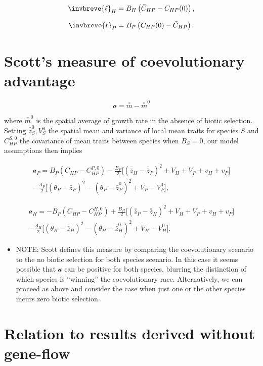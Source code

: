 \documentclass{article}
\begin{document}
\[\invbreve{\ell}_H=B_H\left(\bar C_{HP}-C_{HP}(0)\right),\]

\[\invbreve{\ell}_P=B_P\left(C_{HP}(0)-\bar C_{HP}\right).\]

\hypertarget{scotts-measure-of-coevolutionary-advantage}{%
\section{Scott's measure of coevolutionary
advantage}\label{scotts-measure-of-coevolutionary-advantage}}

\[\mathcal a=\bar{\bar m}-\bar{\bar m}^0\]

where \(\bar{\bar m}^0\) is the spatial average of growth rate in the
absence of biotic selection. Setting \(\bar{\bar z}_S^0, V_S^0\) the
spatial mean and variance of local mean traits for species \(S\) and
\(C_{HP}^{S,0}\) the covariance of mean traits between species when
\(B_S=0\), our model assumptions then implies

\begin{multline}
  \mathcal a_P=B_P(C_{HP}-C_{HP}^{P,0})-\frac{B_P}{2}\big[(\bar{\bar z}_H-\bar{\bar z}_P)^2+V_H+V_P+v_H+v_P\big] \\
  -\frac{A_P}{2}\big[(\theta_P-\bar{\bar z}_P)^2-(\theta_P-\bar{\bar z}_P^0)^2+V_P-V_P^0\big],
\end{multline}

\begin{multline}
  \mathcal a_H=-B_P(C_{HP}-C_{HP}^{H,0})+\frac{B_H}{2}\big[(\bar{\bar z}_P-\bar{\bar z}_H)^2+V_H+V_P+v_H+v_P\big] \\
  -\frac{A_H}{2}\big[(\theta_H-\bar{\bar z}_H)^2-(\theta_H-\bar{\bar z}_H^0)^2+V_H-V_H^0\big].
\end{multline}

\begin{itemize}
\tightlist
\item
  NOTE: Scott defines this measure by comparing the coevolutionary
  scenario to the no biotic selection for both species scenario. In this
  case it seems possible that \(\mathcal a\) can be positive for both
  species, blurring the distinction of which species is ``winning'' the
  coevolutionary race. Alternatively, we can proceed as above and
  consider the case when just one or the other species incurs zero
  biotic selection.
\end{itemize}

\hypertarget{relation-to-results-derived-without-gene-flow}{%
\section{Relation to results derived without
gene-flow}\label{relation-to-results-derived-without-gene-flow}}
\end{document}
